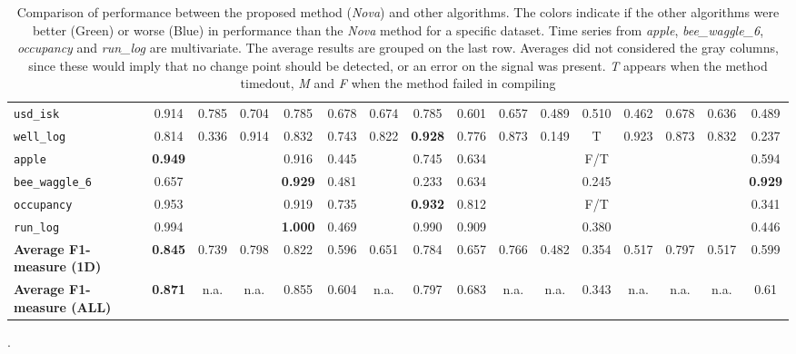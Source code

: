 \begin{table*}[h!]
\begin{adjustbox}{width=\textwidth}
\begin{tabular}{l|c|cccccccccccccc}
    \verb+usd_isk+ & \cellcolor{blue!20}0.914 & 0.785 & 0.704 & 0.785 & 0.678 & 0.674 & 0.785 & 0.601 & 0.657 & 0.489 & 0.510 & 0.462 & 0.678 & 0.636 & 0.489\\
    
    \verb+well_log+ & \cellcolor{SeaGreen!10}0.814 & 0.336 & 0.914 & 0.832 & 0.743 & 0.822 & \textbf{0.928} & 0.776 & 0.873 & 0.149 & T & 0.923 & 0.873 & 0.832 & 0.237\\
    
    \hline
    
    \verb+apple+ & \cellcolor{blue!03}\textbf{0.949} &  &  & 0.916 & 0.445 &  & 0.745 & 0.634 &  &  & F/T &  &  &  & 0.594\\
    
    \verb+bee_waggle_6+ & \cellcolor{SeaGreen!28}0.657 &  &  & \textbf{0.929} & 0.481 &  & 0.233 & 0.634 &  &  & 0.245 &  &  &  & \textbf{0.929}\\
    
    \verb+occupancy+ & \cellcolor{blue!02}0.953 &  &  & 0.919 & 0.735 &  & \textbf{0.932} & 0.812 &  &  & F/T &  &  &  & 0.341\\
    
    \verb+run_log+ & 0.994 &  &  & \textbf{1.000} & 0.469 &  & 0.990 & 0.909 &  &  & 0.380 &  &  &  & 0.446\\
    
    \bottomrule
    
    \textbf{Average F1-measure (1D)} & \cellcolor{blue!05}\textbf{0.845} & 0.739 & 0.798 & 0.822 & 0.596 & 0.651 & 0.784 & 0.657 & 0.766 & 0.482 & 0.354 & 0.517 & 0.797 & 0.517 & 0.599\\
    
    \bottomrule
    
    \textbf{Average F1-measure (ALL)} & \cellcolor{blue!05}\textbf{0.871} & n.a. & n.a. & 0.855 & 0.604 & n.a. & 0.797 & 0.683 & n.a. & n.a. & 0.343 & n.a. & n.a. & n.a. & 0.61
    \end{tabular}
\end{adjustbox}
    \caption{Comparison of performance between the proposed method (\textit{Nova}) and other algorithms. The colors indicate if the other algorithms were better (Green) or worse (Blue) in performance than the \textit{Nova} method for a specific dataset. Time series from \textit{apple}, \textit{bee\_waggle\_6}, \textit{occupancy} and \textit{run\_log} are multivariate. The average results are grouped on the last row. Averages did not considered the gray columns, since these would imply that no change point should be detected, or an error on the signal was present. \textit{T} appears when the method timedout, \textit{M} and \textit{F} when the method failed in compiling}.
    \label{tab:alanturing}
\end{table*}

